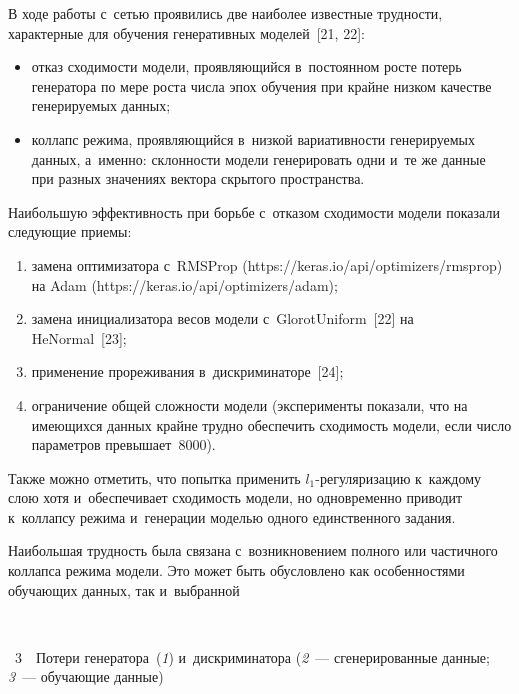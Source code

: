 \begin{multicols}{2}
  В ходе работы с~сетью проявились две наиболее известные трудности, 
характерные для обучения генеративных моделей~[21, 22]:
  \begin{itemize}
\item отказ сходимости модели, проявляющийся в~постоянном росте потерь 
генератора по мере роста числа эпох обуче\-ния при крайне низком качестве 
генерируемых данных;
\item коллапс режима, проявляющийся в~низкой вариативности 
генерируемых данных, а~именно: склонности модели генерировать одни и~те 
же данные при разных значениях вектора скрытого пространства.
\end{itemize}

  Наибольшую эффективность при борьбе с~отказом сходимости модели 
показали следующие при\-емы:
  \begin{enumerate}[(1)]
\item замена оптимизатора с~RMSProp ({\sf https://\linebreak keras.io/api/optimizers/rmsprop}) 
на Adam ({\sf https://keras.io/api/optimizers/adam});
\item замена инициализатора весов модели с~Glorot\-Uniform~[22] на 
HeNormal~[23];
\item применение прореживания в~дискриминаторе~[24];
\item ограничение общей сложности модели (эксперименты показали, что на 
имеющихся данных крайне трудно обеспечить сходимость модели, если 
число параметров превышает~8000).
\end{enumerate}
  
  Также можно отметить, что попытка применить  
$l_1$-ре\-гу\-ля\-ри\-за\-цию к~каждому слою хотя и~обеспечивает 
сходимость модели, но одновременно приводит к~коллапсу режима и~генерации моделью одного единственного задания.
  
  Наибольшая трудность была связана с~возникновением полного или 
частичного коллапса режима модели. Это может быть обусловлено как 
особенностями обуча\-ющих данных, так и~выбранной\linebreak\vspace*{-12pt}

{ \begin{center}  %
 \vspace*{-3pt}
    \mbox{%
\epsfxsize=78.952mm 
}

\end{center}



\noindent
{{\figurename~3}\ \ \small{Потери генератора~(\textit{1}) и~дискриминатора (\textit{2}~--- сгенерированные данные;  
\textit{3}~--- обуча\-ющие данные)
}}}


\end{multicols}
